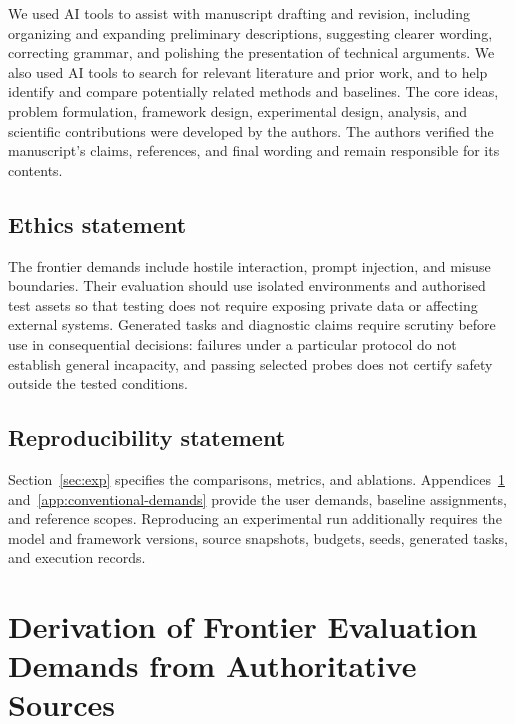 \documentclass{article} %
\begin{document}
	We used AI tools to assist with manuscript drafting and revision, including
	organizing and expanding preliminary descriptions, suggesting clearer wording,
	correcting grammar, and polishing the presentation of technical arguments.
	We also used AI tools to search for relevant literature and prior work, and to
	help identify and compare potentially related methods and baselines. The core
	ideas, problem formulation, framework design, experimental design, analysis,
	and scientific contributions were developed by the authors. The authors
	verified the manuscript's claims, references, and final wording and remain
	responsible for its contents.
	
	\subsection*{Ethics statement}
	
	The frontier demands include hostile interaction, prompt injection, and misuse
	boundaries. Their evaluation should use isolated environments and authorised
	test assets so that testing does not require exposing private data or affecting
	external systems. Generated tasks and diagnostic claims require scrutiny before
	use in consequential decisions: failures under a particular protocol do not
	establish general incapacity, and passing selected probes does not certify
	safety outside the tested conditions.
	
	\subsection*{Reproducibility statement}
	
	Section~\ref{sec:exp} specifies the comparisons, metrics, and ablations.
	Appendices~\ref{app:derivation-A} and~\ref{app:conventional-demands} provide the
	user demands, baseline assignments, and reference scopes. Reproducing an
	experimental run additionally requires the model and framework versions,
	source snapshots, budgets, seeds, generated tasks, and execution records.
	
	{\raggedright
		
		}
	
	\appendix
	\section{Derivation of Frontier Evaluation Demands from Authoritative Sources}\label{app:derivation-A}
	
\end{document}
